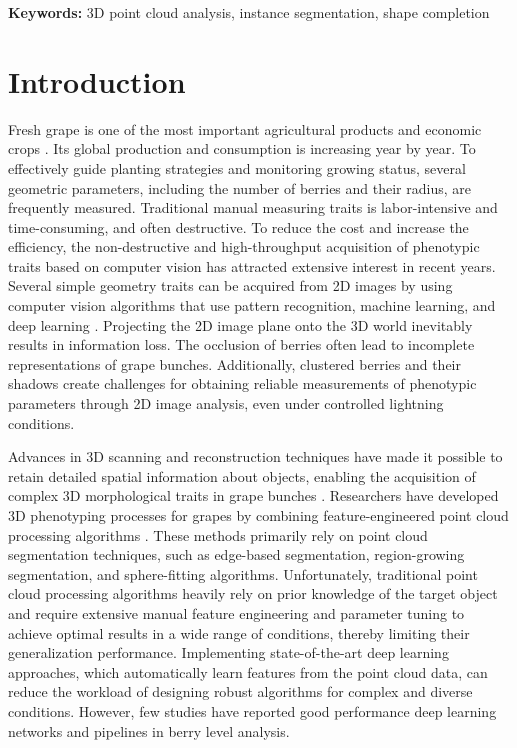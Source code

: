 \documentclass[12pt]{article}
\begin{document}
\textbf{Keywords:} 3D point cloud analysis, instance segmentation, shape completion

\doublespacing

\section{Introduction}
Fresh grape is one of the most important agricultural products and economic crops \citep{alston_grapes_2019}. 
Its global production and consumption is increasing year by year. 
To effectively guide planting strategies and monitoring growing status, several geometric parameters, including the number of berries and their radius, are frequently measured. 
Traditional manual measuring traits is labor-intensive and time-consuming, and often destructive. 
To reduce the cost and increase the efficiency, the non-destructive and high-throughput acquisition of phenotypic traits based on computer vision has attracted extensive interest in recent years. 
Several simple geometry traits can be acquired from 2D images by using computer vision algorithms that use pattern recognition, machine learning, and deep learning \citep{chen_instance_2023, zabawa_counting_2020}. 
Projecting the 2D image plane onto the 3D world inevitably results in information loss. 
The occlusion of berries often lead to incomplete representations of grape bunches. 
Additionally, clustered berries and their shadows create challenges for obtaining reliable measurements of phenotypic parameters through 2D image analysis, even under controlled lightning conditions.

Advances in 3D scanning and reconstruction techniques have made it possible to retain detailed spatial information about objects, enabling the acquisition of complex 3D morphological traits in grape bunches \citep{ni_threedimensional_2021}. 
Researchers have developed 3D phenotyping processes for grapes by combining feature-engineered point cloud processing algorithms \citep{rose_automated_2016, rist_highprecision_2018}. 
These methods primarily rely on point cloud segmentation techniques, such as edge-based segmentation, region-growing segmentation, and sphere-fitting algorithms. 
Unfortunately, traditional point cloud processing algorithms heavily rely on prior knowledge of the target object and require extensive manual feature engineering and parameter tuning to achieve optimal results in a wide range of conditions, thereby limiting their generalization performance.
Implementing state-of-the-art deep learning approaches, which automatically learn features from the point cloud data, can reduce the workload of designing robust algorithms for complex and diverse conditions.
However, few studies have reported good performance deep learning networks and pipelines in berry level analysis. 
\end{document}
